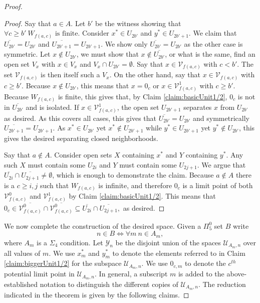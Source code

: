 \documentclass[10pt,a4paper]{amsart}
\begin{document}
\begin{proof}
    \begin{proof}
    Say that $a\in A$.
    Let $b'$ be the witness showing that $\forall c\geq b'~W_{f(a,c)} \text{ is finite.}$
    Consider $x^*\in U_{2b'}$ and $y^*\in U_{2b'+1}$.
    We claim that $\overline{U_{2b'}}=U_{2b'}$ and $\overline{U_{2b'+1}}=U_{2b'+1}$.
    We show only $\overline{U_{2b'}}=U_{2b'}$ as the other case is symmetric.
    Let $x\not\in U_{2b'}$, we must show that $x\not\in\overline{U_{2b'}}$, or what is the same, find an open set $V_x$ with $x\in V_x$ and $V_x\cap U_{2b'}=\emptyset$.
    Say that $x\in \mathcal{V}_{f(a,c)}$ with $c<b'$.
    The set $\mathcal{V}_{f(a,c)}$ is then itself such a $V_x$.
    On the other hand, say that $x\in \mathcal{V}_{f(a,c)}$ with $c\geq b'$.
    Because $x\not\in U_{2b'}$, this means that $x=0_c$ or $x\in \mathcal{V}_{f(a,c)}^1$ with $c\geq b'$.
    Because $W_{f(a,c)}$ is finite, this gives that, by Claim \ref{claim:basicUnit1/2}, $0_c$ is not in $\overline{U_{2b'}}$ and is isolated.
    If $x\in \mathcal{V}_{f(a,c)}^1$, the open set $U_{2b'+1}$ separates $x$ from $U_{2b'}$ as desired.
    As this covers all cases, this gives that $\overline{U_{2b'}}=U_{2b'}$ and symmetrically $\overline{U_{2b'+1}}=U_{2b'+1}$.
    As $x^*\in U_{2b'}$ yet $x^*\not\in U_{2b'+1}$ while $y^*\in U_{2b'+1}$ yet $y^*\not\in U_{2b'}$, this gives the desired separating closed neighborhoods.

    Say that $a\not\in A$.
    Consider open sets $X$ containing $x^*$ and $Y$ containing $y^*$.
    Any such $X$ must contain some $U_{2i}$ and $Y$ must contain some $U_{2j+1}$.
    We argue that $\overline{U_{2i}}\cap \overline{U_{2j+1}}\neq \emptyset$, which is enough to demonstrate the claim.
    Because $a\not\in A$ there is a $c\geq i,j$ such that $W_{f(a,c)}$ is infinite, and therefore $0_c$ is a limit point of both $\mathcal{V}_{f(a,c)}^0$ and $\mathcal{V}_{f(a,c)}^1$ by Claim \ref{claim:basicUnit1/2}.
    This means that $0_c\in \overline{\mathcal{V}_{f(a,c)}^0}\cap\overline{\mathcal{V}_{f(a,c)}^0}\subseteq\overline{U_{2i}}\cap \overline{U_{2j+1}},$ as desired.
    \end{proof}

    

    We now complete the construction of the desired space.
    Given a $\Pi_5^0$ set $B$ write
    \[n\in B \iff \forall m ~ n\in A_m,\]
    where $A_m$ is a $\Sigma_4$ condition.
    Let $\mathcal{Y}_n$ be the disjoint union of the spaces $\mathcal{U}_{A_m,n}$ over all values of $m$.
    We use $x^*_m$ and $y^*_m$ to denote the elements referred to in Claim \ref{claim:biggerUnit1/2} for the subspace $\mathcal{U}_{A_m,n}$.
    We use $0_{c,m}$ to denote the $c^{th}$ potential limit point in $\mathcal{U}_{A_m,n}$.
    In general, a subscript $m$ is added to the above-established notation to distinguish the different copies of $\mathcal{U}_{A_m,n}$.
    The reduction indicated in the theorem is given by the following claims.


\end{proof}
\end{document}
